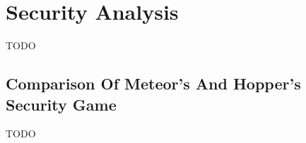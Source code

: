 \chapter{Security Analysis}
\label{chap:security}

TODO

\section{Comparison Of Meteor's And Hopper's Security Game}

TODO

